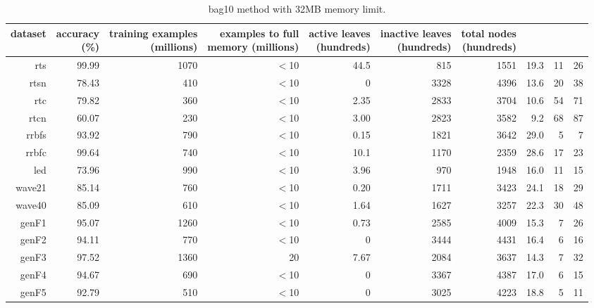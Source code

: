\clearpage
\begin{table}
\caption{{\sc bag10} method with 32MB memory limit.}
\label{tab:bag10-32MB}
\centering
\begin{tabular}{|r|r|r|r|r|r|r|r|r|r|}
\hline
dataset	&
\rotatebox{90}{\parbox{9em}{accuracy\\(\%)}} &
\rotatebox{90}{\parbox{9em}{training examples\\(millions)}} &
\rotatebox{90}{\parbox{9em}{examples to full\\memory (millions)}} &
\rotatebox{90}{\parbox{9em}{active leaves\\(hundreds)}} &
\rotatebox{90}{\parbox{9em}{inactive leaves\\(hundreds)}} &
\rotatebox{90}{\parbox{9em}{total nodes\\(hundreds)}} &
\rotatebox{90}{\parbox{9em}{average tree depth}}	&
\rotatebox{90}{\parbox{9em}{training speed (\%)}} &
\rotatebox{90}{\parbox{9em}{prediction speed (\%)}} \\
\hline
{\sc rts} & 99.99 & 1070 & $<$10 & 44.5 & 815 & 1551 & 19.3 & 11 & 26 \\
{\sc rtsn} & 78.43 & 410 & $<$10 & 0 & 3328 & 4396 & 13.6 & 20 & 38 \\
{\sc rtc} & 79.82 & 360 & $<$10 & 2.35 & 2833 & 3704 & 10.6 & 54 & 71 \\
{\sc rtcn} & 60.07 & 230 & $<$10 & 3.00 & 2823 & 3582 & 9.2 & 68 & 87 \\
{\sc rrbfs} & 93.92 & 790 & $<$10 & 0.15 & 1821 & 3642 & 29.0 & 5 & 7 \\
{\sc rrbfc} & 99.64 & 740 & $<$10 & 10.1 & 1170 & 2359 & 28.6 & 17 & 23 \\
{\sc led} & 73.96 & 990 & $<$10 & 3.96 & 970 & 1948 & 16.0 & 11 & 15 \\
{\sc wave21} & 85.14 & 760 & $<$10 & 0.20 & 1711 & 3423 & 24.1 & 18 & 29 \\
{\sc wave40} & 85.09 & 610 & $<$10 & 1.64 & 1627 & 3257 & 22.3 & 30 & 48 \\
{\sc genF1} & 95.07 & 1260 & $<$10 & 0.73 & 2585 & 4009 & 15.3 & 7 & 26 \\
{\sc genF2} & 94.11 & 770 & $<$10 & 0 & 3444 & 4431 & 16.4 & 6 & 16 \\
{\sc genF3} & 97.52 & 1360 & 20 & 7.67 & 2084 & 3637 & 14.3 & 7 & 32 \\
{\sc genF4} & 94.67 & 690 & $<$10 & 0 & 3367 & 4387 & 17.0 & 6 & 15 \\
{\sc genF5} & 92.79 & 510 & $<$10 & 0 & 3025 & 4223 & 18.8 & 5 & 11 \\

\end{tabular}
\end{table}
